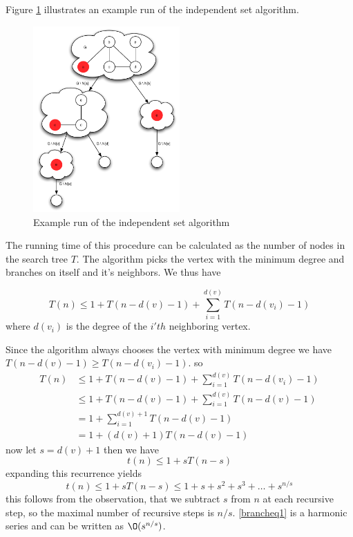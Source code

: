\documentclass[10pt]{article}
\begin{document}
Figure \ref{fig20} illustrates an example run of the independent set algorithm.

\begin{figure}[ht]
\centering
\includegraphics[width=0.50\textwidth]{figures/fig20.pdf}
\caption{Example run of the independent set algorithm}
\label{fig20}
\end{figure}


The running time of this procedure can be calculated as the number of nodes in the search tree $T$. The algorithm picks the vertex with the minimum degree and branches on itself and it's neighbors. We thus have

\begin{equation}
  T(n) \leq 1 + T(n-d(v)-1) + \sum_{i=1}^{d(v)} T(n-d(v_i)-1)
\end{equation}
where $d(v_i)$ is the degree of the $i'th$ neighboring vertex. 

Since the algorithm always chooses the vertex with minimum degree we have $T(n-d(v)-1) \geq T(n-d(v_i)-1)$. so
\begin{align}
T(n) &\leq 1 + T(n-d(v)-1) + \sum_{i=1}^{d(v)} T(n-d(v_i)-1) \\
     &\leq 1 + T(n-d(v)-1) + \sum_{i=1}^{d(v)} T(n-d(v)-1)   \\
     &= 1 + \sum_{i=1}^{d(v)+1} T(n-d(v)-1)                  \\
     &= 1 + (d(v)+1)T(n-d(v)-1)          
\end{align}
now let $s = d(v)+1$ then we have
\begin{equation}
  t(n) \leq 1 + sT(n-s)          
\end{equation}
expanding this recurrence yields
\begin{equation}
  t(n) \leq 1 + sT(n-s) \leq 1 + s + s^2+s^3+\ldots+s^{n/s}  \label{brancheq1}       
\end{equation}
this follows from the observation, that we subtract $s$ from $n$ at each recursive step, so the maximal number of recursive steps is $n/s$. \ref{brancheq1} is a harmonic series and can be written as $\O(s^{n/s})$.
\end{document}
